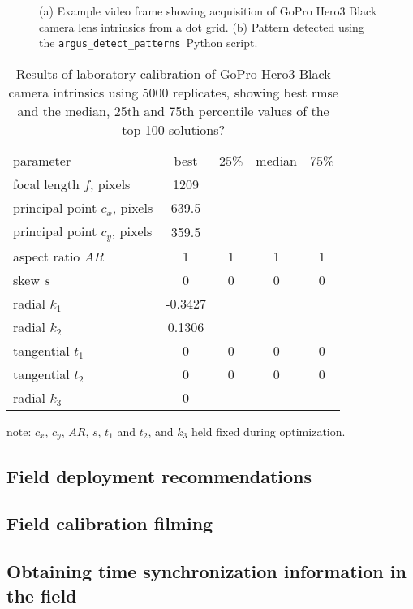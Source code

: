 \documentclass[fleqn,10pt]{wlpeerj}
\newcommand{\detectpatterns}{\texttt{argus\_detect\_patterns}}
\begin{document}
\begin{figure}
\caption{(a) Example video frame showing acquisition of GoPro Hero3 Black camera lens intrinsics from a dot grid.  (b) Pattern detected using the \detectpatterns\ Python script.}
\label{fig:labcal1}
\end{figure}

\begin{table}
\caption{Results of laboratory calibration of GoPro Hero3 Black camera intrinsics using 5000 replicates, showing best rmse and the median, 25th and 75th percentile values of the top 100 solutions? }
\label{tab:labcal2}
\begin{center}
\begin{tabular}{lcccc}
parameter & best & 25\% & median & 75\% \\
\cline{1-5}
focal length $f$, pixels & 1209 & & &\\
principal point $c_x$, pixels & 639.5 & & & \\
principal point $c_y$, pixels & 359.5 & & & \\
aspect ratio $AR$ & 1 & 1 & 1 & 1\\
skew $s$ & 0 & 0 & 0 & 0 \\
radial $k_1$ & -0.3427 & & & \\
radial $k_2$ & 0.1306 & & & \\
tangential $t_1$ & 0 & 0 & 0 & 0 \\
tangential $t_2$ & 0 & 0 & 0 & 0 \\
radial $k_3$ & 0 & & & \\
\end{tabular}
\end{center}
note: $c_x$, $c_y$, $AR$, $s$, $t_1$ and $t_2$, and $k_3$ held fixed during optimization.
\end{table}

\subsection*{Field deployment recommendations}

\subsection*{Field calibration filming}

\subsection*{Obtaining time synchronization information in the field}
\end{document}

